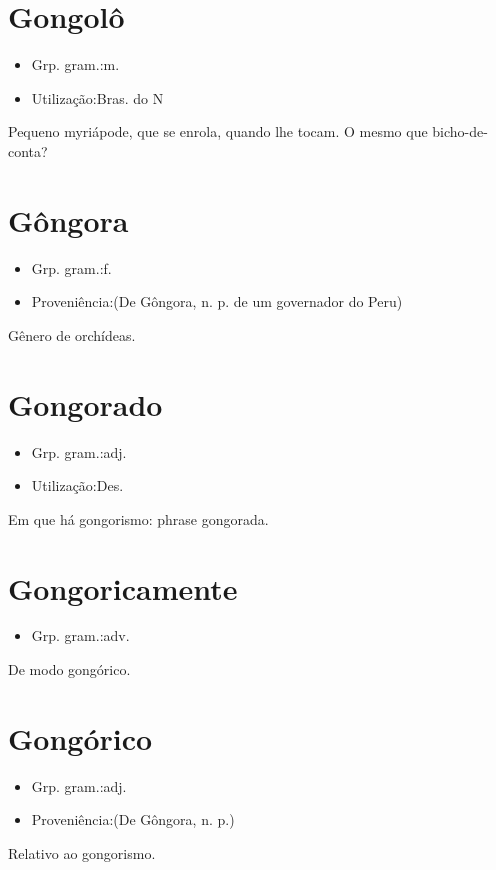 \section{Gongolô}
\begin{itemize}
\item {Grp. gram.:m.}
\end{itemize}
\begin{itemize}
\item {Utilização:Bras. do N}
\end{itemize}
Pequeno myriápode, que se enrola, quando lhe tocam.
O mesmo que \textunderscore bicho-de-conta\textunderscore ?
\section{Gôngora}
\begin{itemize}
\item {Grp. gram.:f.}
\end{itemize}
\begin{itemize}
\item {Proveniência:(De \textunderscore Gôngora\textunderscore , n. p. de um governador do Peru)}
\end{itemize}
Gênero de orchídeas.
\section{Gongorado}
\begin{itemize}
\item {Grp. gram.:adj.}
\end{itemize}
\begin{itemize}
\item {Utilização:Des.}
\end{itemize}
Em que há gongorismo: \textunderscore phrase gongorada\textunderscore .
\section{Gongoricamente}
\begin{itemize}
\item {Grp. gram.:adv.}
\end{itemize}
De modo gongórico.
\section{Gongórico}
\begin{itemize}
\item {Grp. gram.:adj.}
\end{itemize}
\begin{itemize}
\item {Proveniência:(De \textunderscore Gôngora\textunderscore , n. p.)}
\end{itemize}
Relativo ao gongorismo.
